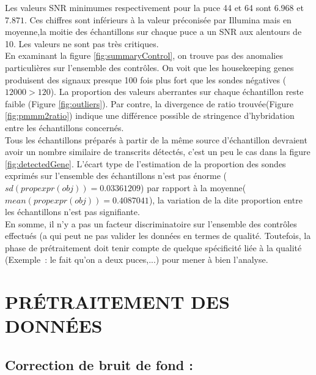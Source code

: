 \documentclass[a4paper,10pt]{article}
\begin{document}
Les valeurs SNR minimumes respectivement pour la puce 44 et 64 sont $6.968$ et $7.871$. Ces chiffres sont inférieurs à la valeur préconisée par Illumina mais en moyenne,la moitie des échantillons sur chaque puce a un SNR aux alentours de 10. Les valeurs ne sont pas très critiques.
\\En examinant la figure \ref{fig:summaryControl}, on trouve pas des anomalies particulières sur l’ensemble des contrôles. On voit que les  housekeeping genes produisent des signaux presque 100 fois plus fort que les sondes négatives ($12000 > 120$).
La proportion des valeurs aberrantes sur chaque échantillon reste faible (Figure \ref{fig:outliers}). 
Par contre, la divergence de ratio trouvée(Figure \ref{fig:pmmm2ratio}) indique une différence possible de stringence d’hybridation entre les échantillons concernés.\\%
Tous les échantillons préparés à partir de la même source d’échantillon devraient avoir un nombre similaire de transcrits détectés, c'est un peu le cas dans la figure \ref{fig:detectedGene}.
L’écart type de l’estimation de la proportion des sondes exprimés sur l’ensemble des échantillons n’est pas énorme ($sd(propexpr(obj))=0.03361209$) par rapport à la moyenne($mean(propexpr(obj))=0.4087041$), la variation de la dite proportion entre les échantillons n'est pas signifiante.
\\En somme, il n’y a pas un facteur discriminatoire sur l’ensemble des contrôles effectués (a qui peut ne pas valider les données en termes de qualité. Toutefois, la phase de prétraitement doit tenir compte de quelque spécificité liée à la qualité (Exemple : le fait qu’on a deux puces,...) pour mener à bien l'analyse.
\section{PR\'{E}TRAITEMENT DES DONN\'{E}ES }
\subsection{Correction de bruit de fond :}
\end{document}
